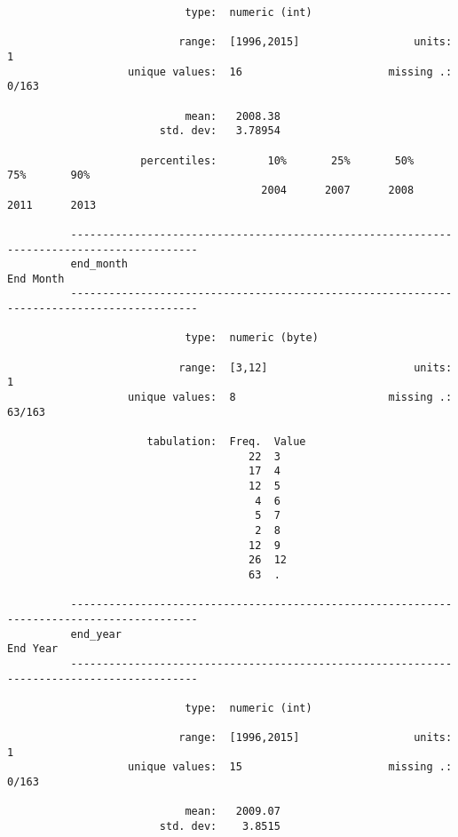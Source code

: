 \documentclass{article}
\begin{document}
\begin{verbatim}
                            type:  numeric (int)
          
                           range:  [1996,2015]                  units:  1
                   unique values:  16                       missing .:  0/163
          
                            mean:   2008.38
                        std. dev:   3.78954
          
                     percentiles:        10%       25%       50%       75%       90%
                                        2004      2007      2008      2011      2013
          
          ------------------------------------------------------------------------------------------
          end_month                                                                        End Month
          ------------------------------------------------------------------------------------------
          
                            type:  numeric (byte)
          
                           range:  [3,12]                       units:  1
                   unique values:  8                        missing .:  63/163
          
                      tabulation:  Freq.  Value
                                      22  3
                                      17  4
                                      12  5
                                       4  6
                                       5  7
                                       2  8
                                      12  9
                                      26  12
                                      63  .
          
          ------------------------------------------------------------------------------------------
          end_year                                                                          End Year
          ------------------------------------------------------------------------------------------
          
                            type:  numeric (int)
          
                           range:  [1996,2015]                  units:  1
                   unique values:  15                       missing .:  0/163
          
                            mean:   2009.07
                        std. dev:    3.8515
          

\end{verbatim}
\end{document}
